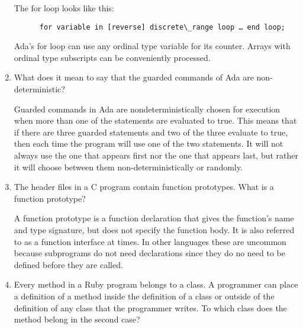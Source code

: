 \begin{enumerate}
  \begin{answer}

    The for loop looks like this:
    \begin{lstlisting}
      for variable in [reverse] discrete\_range loop … end loop;
    \end{lstlisting}
    Ada’s for loop can use any ordinal type variable for
    its counter. Arrays with ordinal type subscripts can be
    conveniently processed.

  \end{answer}

  \item What does it mean to say that the guarded commands
    of Ada are non-deterministic?

  \begin{answer}

    Guarded commands in Ada are nondeterministically chosen
    for execution when more than one of the statements are
    evaluated to true. This means that if there are three
    guarded statements and two of the three evaluate to true,
    then each time the program will use one of the two
    statements. It will not always use the one that appears
    first nor the one that appears last, but rather it will
    choose between them non-deterministically or randomly.

  \end{answer}

  \item The header files in a C program contain function
    prototypes. What is a function prototype?

  \begin{answer}

    A function prototype is a function declaration that gives
    the function's name and type signature, but does not
    specify the function body. It is also referred to as a
    function interface at times. In other languages these are
    uncommon because subprograms do not need declarations since
    they do no need to be defined before they are called.

  \end{answer}

  \item Every method in a Ruby program belongs to a class.
    A programmer can place a definition of a method inside
    the definition of a class or outside of the definition
    of any class that the programmer writes. To which class
    does the method belong in the second case?


\end{enumerate}
